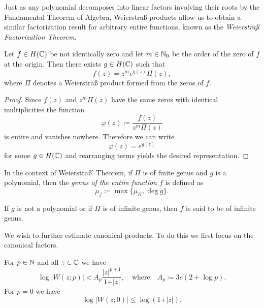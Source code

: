 Just as any polynomial decomposes into linear factors involving their roots by the Fundamental Theorem of Algebra, Weierstraß products allow us to obtain a similar factorization result for arbitrary entire functions, known as the \emph{Weierstraß Factorization Theorem}.

\begin{theorem}[Weierstraß] \label{thm:Weierstraß}
    Let $f \in H(\mathbb{C})$ be not identically zero and let $m \in \mathbb{N}_0$ be the order of the zero of $f$ at the origin. Then there exists $g \in H(\mathbb{C})$ such that
    \begin{equation}
        f(z) = z^m e^{g(z)} \Pi(z),
    \end{equation}
    where $\Pi$ denotes a Weierstraß product formed from the zeros of $f$.
\end{theorem}

\begin{proof}
    Since $f(z)$ and $z^m \Pi(z)$ have the same zeros with identical multiplicities the function
    $$ \varphi(z) \coloneqq \frac{f(z)}{z^m \Pi(z)} $$
    is entire and vanishes nowhere. Therefore we can write
    $$ \varphi(z) = e^{g(z)} $$
    for some $g \in H(\mathbb{C})$ and rearranging terms yields the desired representation.
\end{proof}

\begin{definition} \label{def:genus}
    In the context of Weierstraß' Theorem, if $\Pi$ is of finite genus and $g$ is a polynomial, then the \emph{genus of the entire function $f$} is defined as
    \begin{equation}
        \mu_f \coloneqq \max \{ \mu_\Pi, \deg g \}.
    \end{equation}

    If $g$ is not a polynomial or if $\Pi$ is of infinite genus, then $f$ is said to be of infinite genus.
\end{definition}

We wish to further estimate canonical products. To do this we first focus on the canonical factors.

\begin{lemma} \label{lem:elementary-factor-estimate}
    For $p \in \mathbb{N}$ and all $z \in \mathbb{C}$ we have
    \begin{equation}
        \log \vert W(z; p) \vert < A_p \frac{\vert z \vert^{p+1}}{1 + \vert z \vert}, \quad \textrm{where} \quad A_p \coloneqq 3e (2 + \log p).
    \end{equation}
    For $p = 0$ we have
    \begin{equation}
        \log \vert W(z; 0) \vert \leq \log (1 + \vert z \vert).
    \end{equation}
\end{lemma}

